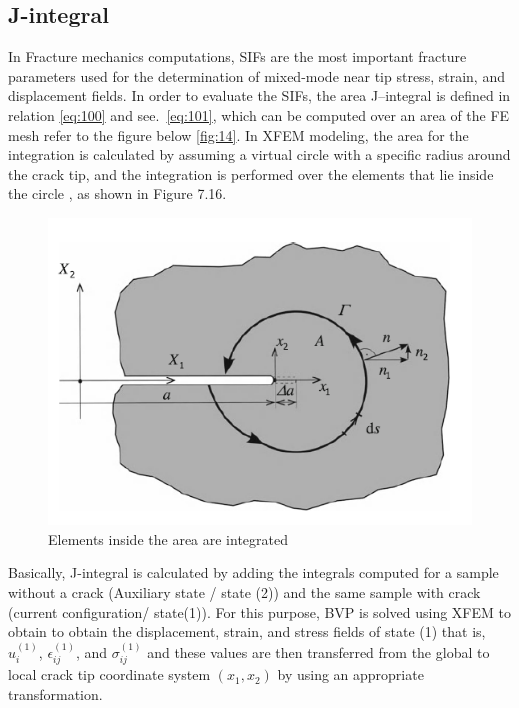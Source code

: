 \documentclass[fleqn, 12.5pt,a4paper]{report}
\begin{document}
\subsection{J-integral}
In Fracture mechanics computations, SIFs are the most important fracture parameters used for the determination of mixed-mode near tip stress, strain, and displacement fields. In order to evaluate the SIFs, the area J–integral is defined in relation \eqref{eq:100} and see.~\autoref{eq:101}, which can be computed over an area of the FE mesh refer to the figure below \autoref{fig:14}. In XFEM modeling, the area for the integration is calculated by assuming a virtual circle with a specific radius around the crack tip, and the integration is performed over the elements that lie inside the circle \cite{kuna2013finite}, as shown in Figure 7.16. 
\begin{figure}[h]
    \centering
    \includegraphics[scale = 1]{J_int.PNG}
    \caption{{Elements inside the area are integrated\cite{kuna2013finite}}}
    \label{fig:14}

\end{figure}    
    
Basically, J-integral is calculated by adding the integrals computed for a sample without a crack (Auxiliary state / state (2)) and the same sample with crack (current configuration/ state(1)). For this purpose, BVP is solved using XFEM to obtain to obtain the displacement, strain, and stress fields of state (1) that is, $u_i^{(1)}$, $\epsilon_{ij}^{(1)}$, and $\sigma_{ij}^{(1)}$ and these values are then transferred from the global to local crack tip coordinate system $(x_1, x_2)$ by using an appropriate transformation.
\end{document}
